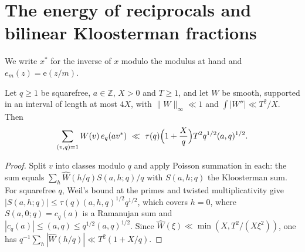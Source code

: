 \documentclass[11pt,a4paper]{article}
\newcommand{\Z}{\mathbb{Z}}\newcommand{\R}{\mathbb{R}}\newcommand{\Off}{\mathrm{Off}}\newcommand{\e}{\mathrm{e}}
\begin{document}
\section{The energy of reciprocals and bilinear Kloosterman fractions}

We write $x^\ast$ for the inverse of $x$ modulo the modulus at hand and $e_m(z)=\e(z/m)$.

\begin{lemma}\label{lem:K}
Let $q\ge1$ be squarefree, $a\in\Z$, $X>0$ and $T\ge1$, and let $W$ be smooth, supported in an interval of length at most $4X$, with $\|W\|_\infty\ll1$ and $\int|W''|\ll T^2/X$. Then
\[
\sum_{(v,q)=1}W(v)\,e_q(av^\ast)\ \ll\ \tau(q)\Bigl(1+\frac Xq\Bigr)T^2q^{1/2}(a,q)^{1/2}.
\]
\end{lemma}
\begin{proof}
Split $v$ into classes modulo $q$ and apply Poisson summation in each: the sum equals $\sum_{h}\widehat W(h/q)S(a,h;q)/q$ with $S(a,h;q)$ the Kloosterman sum. For squarefree $q$,
Weil's bound at the primes and twisted multiplicativity give $|S(a,h;q)|\le\tau(q)(a,h,q)^{1/2}q^{1/2}$, which covers $h=0$, where $S(a,0;q)=c_q(a)$ is a Ramanujan sum and
$|c_q(a)|\le(a,q)\le q^{1/2}(a,q)^{1/2}$. Since $\widehat W(\xi)\ll\min(X,T^2/(X\xi^2))$, one has $q^{-1}\sum_h|\widehat W(h/q)|\ll T^2(1+X/q)$.
\end{proof}
\end{document}
